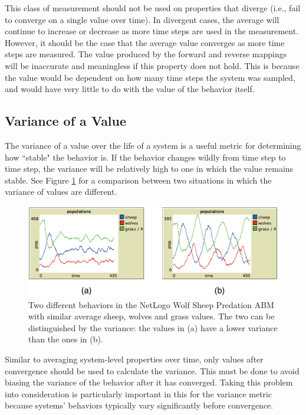 This class of measurement should not be used on properties that diverge (i.e., fail to converge on a single value over time).
In divergent cases, the average will continue to increase or decrease as more time steps are used in the measurement.
However, it should be the case that the average value converges as more time steps are measured.
The value produced by the forward and reverse mappings will be inaccurate and meaningless if this property does not hold.
This is because the value would be dependent on how many time steps the system was sampled, and would have very little to do with the value of the behavior itself.

\subsection{Variance of a Value}
The variance of a value over the life of a system is a useful metric for determining how ``stable" the behavior is.
If the behavior changes wildly from time step to time step, the variance will be relatively high to one in which the value remains stable.
See Figure \ref{fig:variance_compare} for a comparison between two situations in which the variance of values are different.

\begin{figure}[ht]
\centering
\includegraphics{images/variance_comparison.pdf}
\caption{Two different behaviors in the NetLogo Wolf Sheep Predation ABM with similar average sheep, wolves and grass values. The two can be distinguished by the variance: the values in (a) have a lower variance than the ones in (b).}
\label{fig:variance_compare}
\end{figure}

Similar to averaging system-level properties over time, only values after convergence should be used to calculate the variance.
This must be done to avoid biasing the variance of the behavior after it has converged.
Taking this problem into consideration is particularly important in this for the variance metric because systems' behaviors typically vary significantly before convergence.

